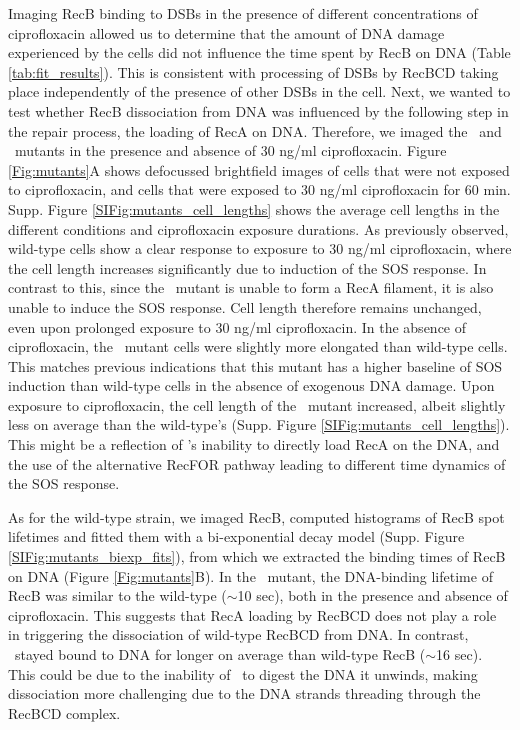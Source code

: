 Imaging RecB binding to DSBs in the presence of different concentrations of ciprofloxacin allowed us to determine that the amount of DNA damage experienced by the cells did not influence the time spent by RecB on DNA (Table \ref{tab:fit_results}). This is consistent with processing of DSBs by RecBCD taking place independently of the presence of other DSBs in the cell. Next, we wanted to test whether RecB dissociation from DNA was influenced by the following step in the repair process, the loading of RecA on DNA. Therefore, we imaged the \dreca\ and \geneteneighty\ mutants in the presence and absence of 30 ng/ml ciprofloxacin. Figure \ref{Fig:mutants}A shows defocussed brightfield images of cells that were not exposed to ciprofloxacin, and cells that were exposed to 30 ng/ml ciprofloxacin for 60 min. Supp. Figure \ref{SIFig:mutants_cell_lengths} shows the average cell lengths in the different conditions and ciprofloxacin exposure durations. As previously observed, wild-type cells show a clear response to exposure to 30 ng/ml ciprofloxacin, where the cell length increases significantly due to induction of the SOS response. In contrast to this, since the \dreca\ mutant is unable to form a RecA filament, it is also unable to induce the SOS response. Cell length therefore remains unchanged, even upon prolonged exposure to 30 ng/ml ciprofloxacin. In the absence of ciprofloxacin, the \geneteneighty\ mutant cells were slightly more elongated than wild-type cells. This matches previous indications that this mutant has a higher baseline of SOS induction than wild-type cells in the absence of exogenous DNA damage\cite{Lepore2023}. Upon exposure to ciprofloxacin, the cell length of the \geneteneighty\ mutant increased, albeit slightly less on average than the wild-type's (Supp. Figure \ref{SIFig:mutants_cell_lengths}). This might be a reflection of \teneighty's inability to directly load RecA on the DNA, and the use of the alternative RecFOR pathway leading to different time dynamics of the SOS response\cite{Ivancic-Bace_2003,Lepore2023}.

As for the wild-type strain, we imaged RecB, computed histograms of RecB spot lifetimes and fitted them with a bi-exponential decay model (Supp. Figure \ref{SIFig:mutants_biexp_fits}), from which we extracted the binding times of RecB on DNA (Figure \ref{Fig:mutants}B). In the \dreca\ mutant, the DNA-binding lifetime of RecB was similar to the wild-type ($\sim$10 sec), both in the presence and absence of ciprofloxacin. This suggests that RecA loading by RecBCD does not play a role in triggering the dissociation of wild-type RecBCD from DNA. In contrast, \teneighty\ stayed bound to DNA for longer on average than wild-type RecB ($\sim$16 sec). This could be due to the inability of \teneighty\ to digest the DNA it unwinds, making dissociation more challenging due to the DNA strands threading through the RecBCD complex.


